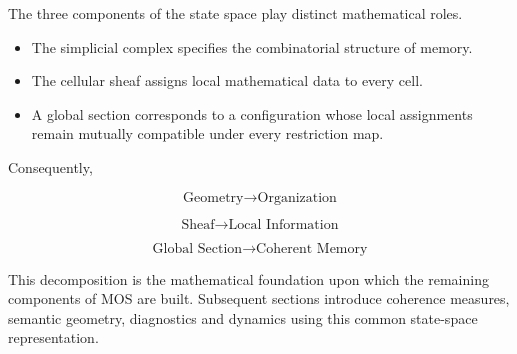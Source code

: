 
\begin{highlightbox}

\BodyFont

The three components of the state space play distinct mathematical roles.

\begin{itemize}

\item The simplicial complex specifies the combinatorial structure of
memory.

\item The cellular sheaf assigns local mathematical data to every cell.

\item A global section corresponds to a configuration whose local
assignments remain mutually compatible under every restriction map.

\end{itemize}

Consequently,

\[
\boxed{
\text{Geometry}
\longrightarrow
\text{Organization}
}
\]

\[
\boxed{
\text{Sheaf}
\longrightarrow
\text{Local Information}
}
\]

\[
\boxed{
\text{Global Section}
\longrightarrow
\text{Coherent Memory}
}
\]

\end{highlightbox}


\begin{remarkbox}

\BodyFont

This decomposition is the mathematical foundation upon which the remaining
components of MOS are built. Subsequent sections introduce coherence
measures, semantic geometry, diagnostics and dynamics using this common
state-space representation.

\end{remarkbox}